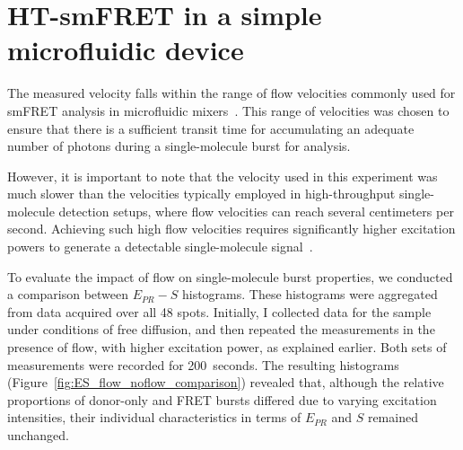 \section{HT-smFRET in a simple microfluidic device}
\label{sec:smFRET_microfluidics}

The measured velocity falls within the range of flow velocities commonly used for \ac{smFRET} analysis in microfluidic mixers~\cite{lipman_science_2003, wunderlich_NP_2013}. 
This range of velocities was chosen to ensure that there is a sufficient transit time for accumulating an adequate number of photons during a single-molecule burst for analysis.

However, it is important to note that the velocity used in this experiment was much slower than the velocities typically employed in high-throughput single-molecule detection setups, where flow velocities can reach several centimeters per second. 
Achieving such high flow velocities requires significantly higher excitation powers to generate a detectable single-molecule signal~\cite{horrocks_AC_2012}.

To evaluate the impact of flow on single-molecule burst properties, we conducted a comparison between $E_{PR}-S$ histograms. 
These histograms were aggregated from data acquired over all 48 spots. 
Initially, I collected data for the sample under conditions of free diffusion, and then repeated the measurements in the presence of flow, with higher excitation power, as explained earlier. 
Both sets of measurements were recorded for 200~seconds. 
The resulting histograms (Figure~\ref{fig:ES_flow_noflow_comparison}) revealed that, although the relative proportions of donor-only and FRET bursts differed due to varying excitation intensities, their individual characteristics in terms of $E_{PR}$ and $S$ remained unchanged.

